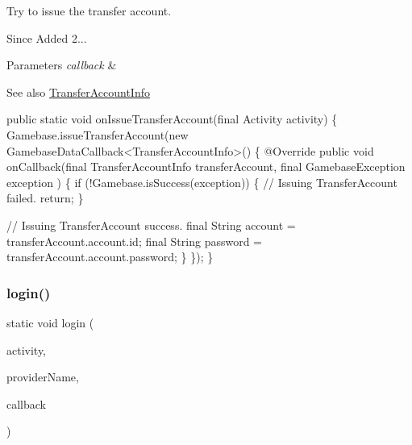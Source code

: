 Try to issue the transfer account. 

\begin{DoxySince}{Since}
Added 2... 
\end{DoxySince}

\begin{DoxyParams}{Parameters}
{\em callback} & \\
\hline
\end{DoxyParams}
\begin{DoxySeeAlso}{See also}
\hyperlink{}{Transfer\+Account\+Info}
\end{DoxySeeAlso}

\begin{DoxyCode}
\textcolor{keyword}{public} \textcolor{keyword}{static} \textcolor{keywordtype}{void} onIssueTransferAccount(\textcolor{keyword}{final} Activity activity) \{
    Gamebase.issueTransferAccount(\textcolor{keyword}{new} GamebaseDataCallback<TransferAccountInfo>() \{
        @Override
        \textcolor{keyword}{public} \textcolor{keywordtype}{void} onCallback(\textcolor{keyword}{final} TransferAccountInfo transferAccount, \textcolor{keyword}{final} GamebaseException exception
      ) \{
            \textcolor{keywordflow}{if} (!Gamebase.isSuccess(exception)) \{
                \textcolor{comment}{// Issuing TransferAccount failed.}
                \textcolor{keywordflow}{return};
            \}

            \textcolor{comment}{// Issuing TransferAccount success.}
            \textcolor{keyword}{final} String account = transferAccount.account.id;
            \textcolor{keyword}{final} String password = transferAccount.account.password;
        \}
    \});
\}
\end{DoxyCode}
 \mbox{\label{classcom_1_1toast_1_1android_1_1gamebase_1_1_gamebase_a277a8a1672aeb0ac6b20e7ebcd4e09b5}} 
\subsubsection{\texorpdfstring{login()}{login()}\hspace{0.1cm}{\footnotesize\ttfamily [1/3]}}
{\footnotesize\ttfamily static void login (\begin{DoxyParamCaption}\item[{@Non\+Null final Activity}]{activity,  }\item[{final String}]{provider\+Name,  }\item[{@Nullable final \hyperlink{interfacecom_1_1toast_1_1android_1_1gamebase_1_1_gamebase_data_callback}{Gamebase\+Data\+Callback}$<$ \hyperlink{classcom_1_1toast_1_1android_1_1gamebase_1_1auth_1_1data_1_1_auth_token}{Auth\+Token} $>$}]{callback }\end{DoxyParamCaption})\hspace{0.3cm}{\ttfamily [static]}}



